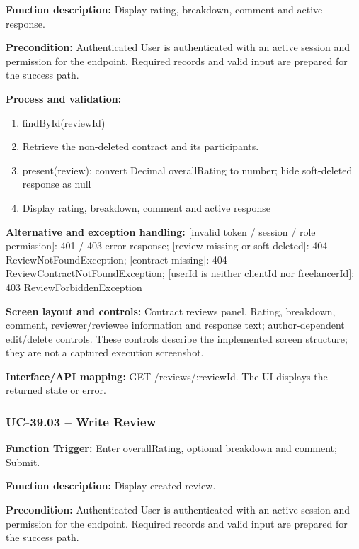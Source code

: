 \textbf{Function description:} Display rating, breakdown, comment and active response.

\textbf{Precondition:} Authenticated User is authenticated with an active session and permission for the endpoint. Required records and valid input are prepared for the success path.

\textbf{Process and validation:}
\begin{enumerate}
\item find\allowbreak{}By\allowbreak{}Id(review\allowbreak{}Id)
\item Retrieve the non-deleted contract and its participants.
\item present(review): convert Decimal overall\allowbreak{}Rating to number; hide soft-deleted response as null
\item Display rating, breakdown, comment and active response
\end{enumerate}
\textbf{Alternative and exception handling:} [invalid token /\allowbreak{} session /\allowbreak{} role permission]: 401 /\allowbreak{} 403 error response; [review missing or soft-deleted]: 404 Review\allowbreak{}Not\allowbreak{}Found\allowbreak{}Exception; [contract missing]: 404 Review\allowbreak{}Contract\allowbreak{}Not\allowbreak{}Found\allowbreak{}Exception; [user\allowbreak{}Id is neither client\allowbreak{}Id nor freelancer\allowbreak{}Id]: 403 Review\allowbreak{}Forbidden\allowbreak{}Exception

\textbf{Screen layout and controls:} Contract reviews panel. Rating, breakdown, comment, reviewer/\allowbreak{}reviewee information and response text; author-dependent edit/\allowbreak{}delete controls. These controls describe the implemented screen structure; they are not a captured execution screenshot.

\textbf{Interface/\allowbreak{}API mapping:} GET /\allowbreak{}reviews/\allowbreak{}:review\allowbreak{}Id. The UI displays the returned state or error.

\subsubsection{UC-39.03 -- Write Review}
\textbf{Function Trigger:} Enter overall\allowbreak{}Rating, optional breakdown and comment; Submit.

\textbf{Function description:} Display created review.

\textbf{Precondition:} Authenticated User is authenticated with an active session and permission for the endpoint. Required records and valid input are prepared for the success path.

